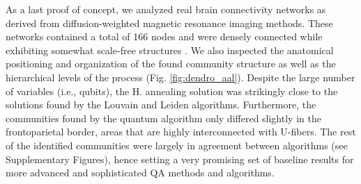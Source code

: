 \documentclass[pdflatex,sn-mathphys-num]{sn-jnl}%
\begin{document}
As a last proof of concept, we analyzed real brain connectivity networks as derived from diffusion-weighted magnetic resonance imaging methods. These networks contained a total of 166 nodes and were densely connected while exhibiting somewhat scale-free structures \cite{falco2024functional}. We also inspected the anatomical positioning and organization of the found community structure as well as the hierarchical levels of the process (Fig. \ref{fig:dendro_aal}). Despite the large number of variables (i.e., qubits), the H. annealing solution was strikingly close to the solutions found by the Louvain and Leiden algorithms. Furthermore, the communities found by the quantum algorithm only differed slightly in the frontoparietal border, areas that are highly interconnected with U-fibers. The rest of the identified communities were largely in agreement between algorithms (see Supplementary Figures), hence setting a very promising set of baseline results for more advanced and sophisticated QA methods and algorithms.
\end{document}
